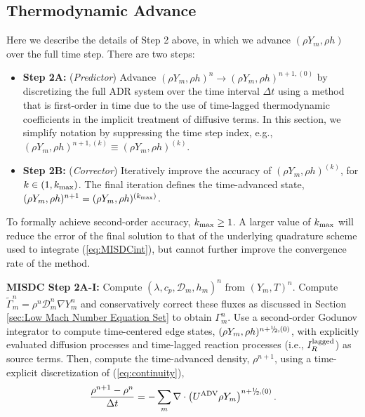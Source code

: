 \subsection{Thermodynamic Advance}\label{sec:Thermodynamic Advance}
Here we describe the details of Step 2 above, in
which we advance $(\rho Y_m,\rho h)$ over the full time step.
There are two steps:
\begin{itemize}
\item {\bf Step 2A:} ({\it Predictor}) Advance 
               $(\rho Y_m,\rho h)^n \rightarrow (\rho Y_m,\rho h)^{n+1,(0)}$ by 
               discretizing the full ADR system over the time interval $\Delta t$ using 
               a method that is first-order in time due to the use of
               time-lagged thermodynamic coefficients in the implicit
               treatment of diffusive terms. In this section, we simplify notation
               by suppressing the time step index,
               e.g., $(\rho Y_m,\rho h)^{n+1,(k)} \equiv (\rho Y_m,\rho h)^{(k)}$.
\item {\bf Step 2B:} ({\it Corrector}) Iteratively improve the accuracy of
               $(\rho Y_m,\rho h)^{(k)}$, for $k \in (1,k_{\rm max})$. 
               The final iteration defines the time-advanced state, 
               $(\rho Y_m,\rho h)^{n+1} = (\rho Y_m,\rho h)^{(k_{\rm max})}$.
\end{itemize}
To formally achieve
second-order accuracy, $k_{\rm max} \ge 1$.  A larger value of $k_{\rm max}$ will reduce the error 
of the final solution to that of the underlying quadrature scheme used to integrate (\ref{eq:MISDCint}),
but cannot further improve the convergence rate of the method.

{\bf MISDC Step 2A-I:} Compute $(\lambda,c_p,\mathcal D_m,h_m)^n$ from $(Y_m,T)^n$.  Compute 
$\widetilde\Gamma_m^n = \rho^n \mathcal D_m^n \nabla Y_m^n$ and conservatively
correct these fluxes as discussed in Section \ref{sec:Low Mach Number Equation Set} 
to obtain $\Gamma_m^n$.  Use a second-order Godunov integrator to compute 
time-centered edge states, $(\rho Y_m,\rho h)^{n+\myhalf,(0)}$, with explicitly evaluated diffusion
processes and time-lagged reaction processes (i.e., $I_R^{\rm lagged}$) as source terms.
Then, compute the time-advanced density, $\rho^{n+1}$, using a time-explicit discretization
of (\ref{eq:continuity}),
\begin{equation}
\frac{\rho^{n+1} - \rho^n}{\Delta t} = -\sum_m\nabla\cdot\left(\uadv\rho Y_m\right)^{n+\myhalf,(0)}.
\end{equation}

